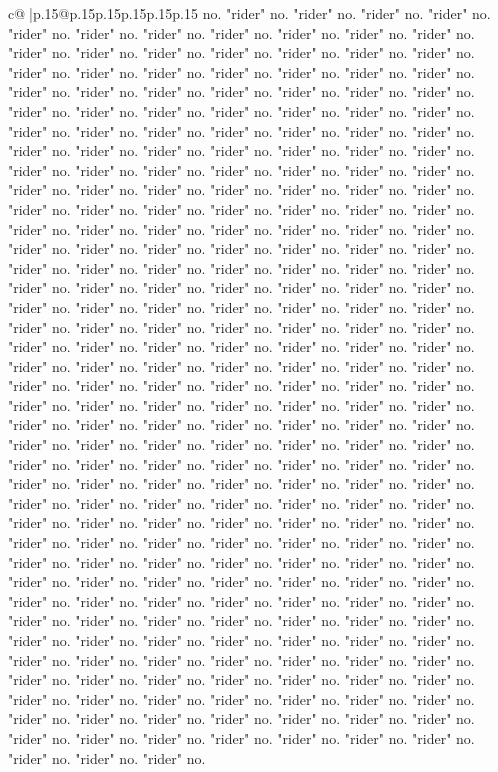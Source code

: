 \documentclass{article}
\begin{document}
{\begin{supertabular}{c@{$\;$}|p{.15\linewidth}@{}p{.15\linewidth}p{.15\linewidth}p{.15\linewidth}p{.15\linewidth}p{.15\linewidth}}
{{{no. "rider" no. "rider" no. "rider" no. "rider" no. "rider" no. "rider" no. "rider" no. "rider" no. "rider" no. "rider" no. "rider" no. "rider" no. "rider" no. "rider" no. "rider" no. "rider" no. "rider" no. "rider" no. "rider" no. "rider" no. "rider" no. "rider" no. "rider" no. "rider" no. "rider" no. "rider" no. "rider" no. "rider" no. "rider" no. "rider" no. "rider" no. "rider" no. "rider" no. "rider" no. "rider" no. "rider" no. "rider" no. "rider" no. "rider" no. "rider" no. "rider" no. "rider" no. "rider" no. "rider" no. "rider" no. "rider" no. "rider" no. "rider" no. "rider" no. "rider" no. "rider" no. "rider" no. "rider" no. "rider" no. "rider" no. "rider" no. "rider" no. "rider" no. "rider" no. "rider" no. "rider" no. "rider" no. "rider" no. "rider" no. "rider" no. "rider" no. "rider" no. "rider" no. "rider" no. "rider" no. "rider" no. "rider" no. "rider" no. "rider" no. "rider" no. "rider" no. "rider" no. "rider" no. "rider" no. "rider" no. "rider" no. "rider" no. "rider" no. "rider" no. "rider" no. "rider" no. "rider" no. "rider" no. "rider" no. "rider" no. "rider" no. "rider" no. "rider" no. "rider" no. "rider" no. "rider" no. "rider" no. "rider" no. "rider" no. "rider" no. "rider" no. "rider" no. "rider" no. "rider" no. "rider" no. "rider" no. "rider" no. "rider" no. "rider" no. "rider" no. "rider" no. "rider" no. "rider" no. "rider" no. "rider" no. "rider" no. "rider" no. "rider" no. "rider" no. "rider" no. "rider" no. "rider" no. "rider" no. "rider" no. "rider" no. "rider" no. "rider" no. "rider" no. "rider" no. "rider" no. "rider" no. "rider" no. "rider" no. "rider" no. "rider" no. "rider" no. "rider" no. "rider" no. "rider" no. "rider" no. "rider" no. "rider" no. "rider" no. "rider" no. "rider" no. "rider" no. "rider" no. "rider" no. "rider" no. "rider" no. "rider" no. "rider" no. "rider" no. "rider" no. "rider" no. "rider" no. "rider" no. "rider" no. "rider" no. "rider" no. "rider" no. "rider" no. "rider" no. "rider" no. "rider" no. "rider" no. "rider" no. "rider" no. "rider" no. "rider" no. "rider" no. "rider" no. "rider" no. "rider" no. "rider" no. "rider" no. "rider" no. "rider" no. "rider" no. "rider" no. "rider" no. "rider" no. "rider" no. "rider" no. "rider" no. "rider" no. "rider" no. "rider" no. "rider" no. "rider" no. "rider" no. "rider" no. "rider" no. "rider" no. "rider" no. "rider" no. "rider" no. "rider" no. "rider" no. "rider" no. "rider" no. "rider" no. "rider" no. "rider" no. "rider" no. "rider" no. "rider" no. "rider" no. "rider" no. "rider" no. "rider" no. "rider" no. "rider" no. "rider" no. "rider" no. "rider" no. "rider" no. "rider" no. "rider" no. "rider" no. "rider" no. "rider" no. "rider" no. "rider" no. "rider" no. "rider" no. "rider" no. "rider" no. "rider" no. "rider" no. "rider" no. "rider" no. "rider" no. "rider" no. "rider" no. "rider" no. "rider" no. "rider" no. "rider" no. "rider" no. "rider" no. "rider" no. "rider" no. "rider" no. "rider" no. "rider" no. "rider" no. "rider" no. "rider" no. "rider" no. "rider" no. "rider" no. "rider" no. "rider" no. "rider" no. "rider" no. "rider" no. "rider" no. "rider" no. "rider" no. "rider" no. "rider" no. "rider" no. "rider" no. "rider" no. "rider" no. }}}
\end{supertabular}}
\end{document}
